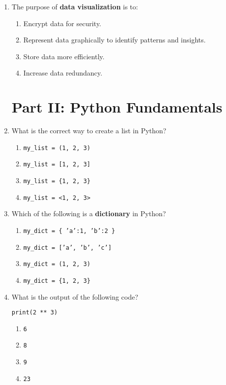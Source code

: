 \documentclass[twocolumn]{article}
\begin{document}
\begin{enumerate}
\item The purpose of \textbf{data visualization} is to:
\begin{enumerate}
    \item Encrypt data for security.
    \item Represent data graphically to identify patterns and insights.
    \item Store data more efficiently.
    \item Increase data redundancy.
\end{enumerate}

\section*{Part II: Python Fundamentals}

\item What is the correct way to create a list in Python?
\begin{enumerate}
    \item \texttt{my\_list = (1, 2, 3)}
    \item \texttt{my\_list = [1, 2, 3]}
    \item \texttt{my\_list = \{1, 2, 3\}}
    \item \texttt{my\_list = <1, 2, 3>}
\end{enumerate}

\item Which of the following is a \textbf{dictionary} in Python?
\begin{enumerate}
    \item \texttt{my\_dict = \{ 'a':1, 'b':2 \}}
    \item \texttt{my\_dict = ['a', 'b', 'c']}
    \item \texttt{my\_dict = (1, 2, 3)}
    \item \texttt{my\_dict = \{1, 2, 3\}}
\end{enumerate}

\item What is the output of the following code?
\begin{verbatim}
print(2 ** 3)
\end{verbatim}
\begin{enumerate}
    \item \texttt{6}
    \item \texttt{8}
    \item \texttt{9}
    \item \texttt{23}
\end{enumerate}


\end{enumerate}
\end{document}
